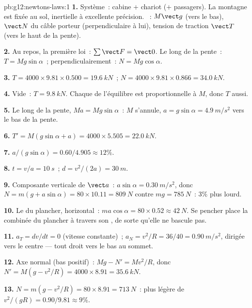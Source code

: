 \begin{solution}{pb:g12:newtons-laws:1}
\textbf{1.} Système~: cabine $+$ chariot ($+$ passagers). La montagne
est fixée au sol, inertielle à excellente précision. ~:
 $M\vect g$ (vers le bas),  $\vect N$
du câble porteur (perpendiculaire à lui), tension de traction
$\vect T$ (vers le haut de la pente).

\textbf{2.} Au repos, la première loi~: $\sum \vect F = \vect 0$. Le
long de la pente~: $T = Mg\sin\alpha$~; perpendiculairement~:
$N = Mg\cos\alpha$.

\textbf{3.} $T = 4000 \times 9.81 \times 0.500 = \qty{19.6}{kN}$~;
$N = 4000 \times 9.81 \times 0.866 = \qty{34.0}{kN}$.

\textbf{4.} Vide~: $T = \qty{9.8}{kN}$. Chaque  de l'équilibre
est proportionnelle à $M$, donc $T$ aussi.

\textbf{5.} Le long de la pente, $Ma = Mg\sin\alpha$~: $M$ s'annule,
$a = g\sin\alpha = \qty{4.9}{m/s^2}$ vers le bas de la pente.

\textbf{6.} $T' = M(g\sin\alpha + a) = 4000 \times 5.505 =
\qty{22.0}{kN}$.

\textbf{7.} $a/(g\sin\alpha) = 0.60/4.905 \approx 12\%$.

\textbf{8.} $t = v/a = \qty{10}{s}$~; $d = v^2/(2a) = \qty{30}{m}$.

\textbf{9.} Composante verticale de $\vect a$~: $a\sin\alpha =
\qty{0.30}{m/s^2}$, donc $N = m(g + a\sin\alpha) = 80 \times 10.11 =
\qty{809}{N}$ contre $mg = \qty{785}{N}$~: $3\%$ plus lourd.

\textbf{10.} Le  du plancher, horizontal~:
$ma\cos\alpha = 80 \times 0.52 \approx \qty{42}{N}$. Se pencher
place la  combinée du plancher à travers son
, de sorte qu'elle ne bascule pas.

\textbf{11.} $a_T = dv/dt = 0$ (vitesse constante)~;
$a_N = v^2/R = 36/40 = \qty{0.90}{m/s^2}$, dirigée vers le centre ---
tout droit vers le bas au sommet.

\textbf{12.} Axe normal (bas positif)~: $Mg - N' = Mv^2/R$, donc
$N' = M(g - v^2/R) = 4000 \times 8.91 = \qty{35.6}{kN}$.

\textbf{13.} $N = m(g - v^2/R) = 80 \times 8.91 = \qty{713}{N}$~:
plus légère de $v^2/(gR) = 0.90/9.81 \approx 9\%$.


\end{solution}
